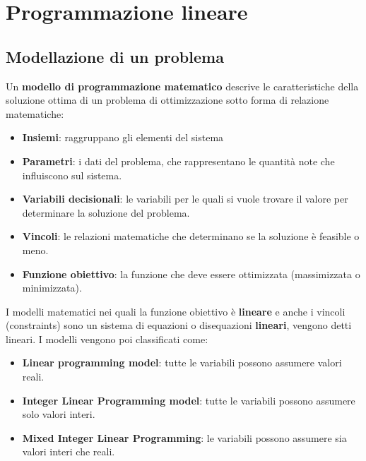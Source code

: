 


\chapter{Programmazione lineare}

\section{Modellazione di un problema}

Un \textbf{modello di programmazione matematico} descrive le caratteristiche della soluzione ottima di un problema di ottimizzazione sotto forma di relazione matematiche:

\begin{itemize}
	\item \textbf{Insiemi}: raggruppano gli elementi del sistema
	\item \textbf{Parametri}: i dati del problema, che rappresentano le quantità note che influiscono sul sistema.
	\item \textbf{Variabili decisionali}: le variabili per le quali si vuole trovare il valore per determinare la soluzione del problema.
	\item \textbf{Vincoli}: le relazioni matematiche che determinano se la soluzione è feasible o meno.
	\item \textbf{Funzione obiettivo}: la funzione che deve essere ottimizzata (massimizzata o minimizzata).
\end{itemize}

I modelli matematici nei quali la funzione obiettivo è \textbf{lineare} e anche i vincoli (constraints) sono un sistema di equazioni o disequazioni \textbf{lineari}, vengono detti lineari.
I modelli vengono poi classificati come:

\begin{itemize}
	\item \textbf{Linear programming model}: tutte le variabili possono assumere valori reali.
	\item \textbf{Integer Linear Programming model}: tutte le variabili possono assumere solo valori interi.
	\item \textbf{Mixed Integer Linear Programming}: le variabili possono assumere sia valori interi che reali.
\end{itemize}

